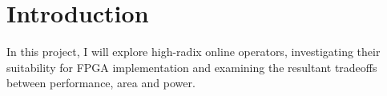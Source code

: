 \section{Introduction}

In this project, I will explore high-radix online operators, investigating their suitability for FPGA implementation and examining the resultant tradeoffs between performance, area and power.
